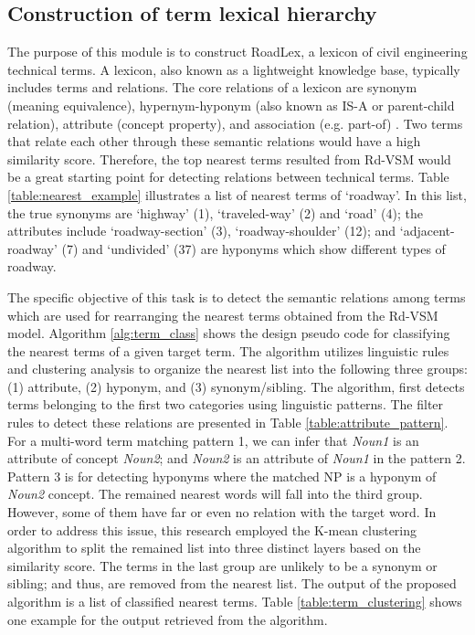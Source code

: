 \documentclass[Journal,InsideFigs, DoubleSpace]{ascelike} %
\begin{document}
\subsection{Construction of term lexical hierarchy}
The purpose of this module is to construct RoadLex, a lexicon of civil engineering technical terms. A lexicon, also known as a lightweight knowledge base, typically includes terms and relations. The core relations of a lexicon are synonym (meaning equivalence), hypernym-hyponym (also known as IS-A or parent-child relation), attribute (concept property), and association (e.g. part-of) \cite{jiang1997semantic,lee13}. Two terms that relate each other through these semantic relations would have a high similarity score. Therefore, the top nearest terms resulted from Rd-VSM would be a great starting point for detecting relations between technical terms. Table \ref{table:nearest_example} illustrates a list of nearest terms of `roadway'. In this list, the true synonyms are `highway' (1), `traveled-way' (2) and `road' (4); the attributes include `roadway-section' (3), `roadway-shoulder' (12); and `adjacent-roadway' (7) and `undivided' (37) are hyponyms which show different types of roadway.
\par
The specific objective of this task is to detect the semantic relations among terms which are used for rearranging the nearest terms obtained from the Rd-VSM model. Algorithm \ref{alg:term_class} shows the design pseudo code for classifying the nearest terms of a given target term. The algorithm utilizes linguistic rules and clustering analysis to organize the nearest list into the following three groups: (1) attribute, (2) hyponym, and (3) synonym/sibling. The algorithm, first detects terms belonging to the first two categories using linguistic patterns. The filter rules to detect these relations are presented in Table \ref{table:attribute_pattern}. For a multi-word term matching pattern 1, we can infer that \textit{Noun1} is an attribute of concept \textit{Noun2}; and \textit{Noun2} is an attribute of \textit{Noun1} in the pattern 2. Pattern 3 is for detecting hyponyms where the matched NP is a hyponym of \textit{Noun2} concept.  The remained nearest words will fall into the third group. However, some of them have far or even no relation with the target word. In order to address this issue, this research employed the K-mean clustering algorithm \cite{macqueen67} to split the remained list into three distinct layers based on the similarity score. The terms in the last group are unlikely to be a synonym or sibling; and thus, are removed from the nearest list. The output of the proposed algorithm is a list of classified nearest terms. Table \ref{table:term_clustering} shows one example for the output retrieved from the algorithm. 
\end{document}
